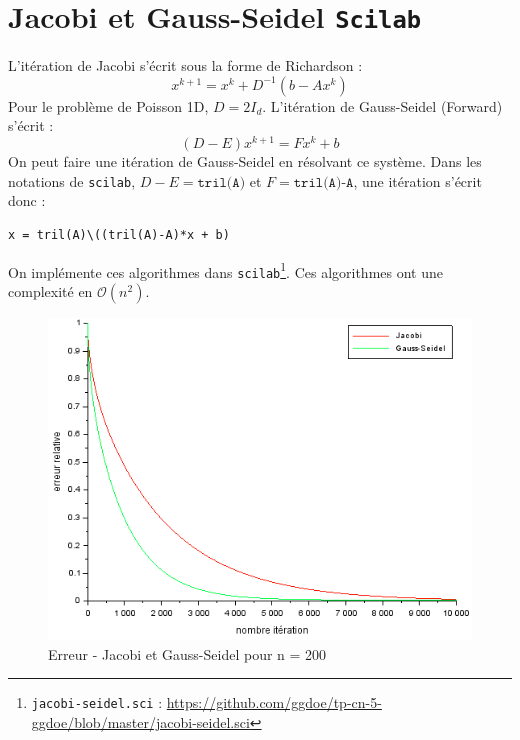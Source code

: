 \documentclass{article}
\begin{document}
\section{Jacobi et Gauss-Seidel \texttt{Scilab}}
L'itération de Jacobi s'écrit sous la forme de Richardson :
\[
	x^{k+1} = x^k + D^{-1}(b-Ax^k)
\]
Pour le problème de Poisson 1D, $D = 2I_d$.
L'itération de Gauss-Seidel (Forward) s'écrit :
\[
	(D-E)x^{k+1} = Fx^k + b
\]
On peut faire une itération de Gauss-Seidel en résolvant ce système. Dans les notations de \texttt{scilab}, $D-E = \texttt{tril(A)}$ et $F = \texttt{tril(A)-A}$, une itération s'écrit donc :
\begin{verbatim}
x = tril(A)\((tril(A)-A)*x + b)
\end{verbatim}
On implémente ces algorithmes dans \texttt{scilab}\footnote{\texttt{jacobi-seidel.sci} : \href{https://github.com/ggdoe/tp-cn-5-ggdoe/blob/master/jacobi-seidel.sci}{https://github.com/ggdoe/tp-cn-5-ggdoe/blob/master/jacobi-seidel.sci}}. Ces algorithmes ont une complexité en \(\mathcal{O}(n^2)\).
\begin{figure}[H]
\caption{Erreur - Jacobi et Gauss-Seidel pour n = 200}
\centering
\includegraphics[scale=0.70]{conv_jac_seid_n200}
\end{figure}
\end{document}

